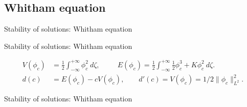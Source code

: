 \subsection{Whitham equation}
\begin{frame}[t]{Stability of solutions: Whitham equation}


\end{frame}
\begin{frame}[t]{Stability of solutions: Whitham equation}


\begin{align*}
V( \phi_c ) &= \frac{1}{2} \int_{-\infty}^{+\infty} \phi_c ^2~d\zeta, \qquad~~
E( \phi_c ) = \frac{1}{2}\int_{-\infty}^{+\infty} \frac{1}{2} \phi_c ^3 + K \phi_c ^2~d\zeta.\\
d(c) &= E( \phi_c ) -c V( \phi_c ), \qquad d'(c)=V( \phi_c )= 1/2\|\phi_c\|_{L^2}^2.
\end{align*}

\end{frame}
\begin{frame}[t]{Stability of solutions: Whitham equation}
\end{frame}
